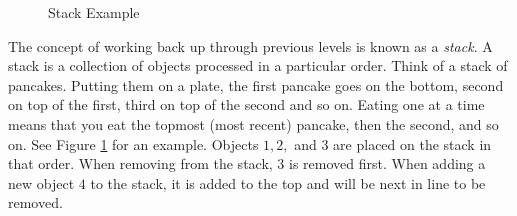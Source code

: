\documentclass[12pt,twoside]{reedthesis}
\begin{document}
\begin{figure}[h]
	\centering
	\caption{Stack Example}
	\label{fig:stack}
\end{figure}

The concept of working back up through previous levels is known as a \textit{stack}. A stack is a collection of objects processed in a particular order. Think of a stack of pancakes. Putting them on a plate, the first pancake goes on the bottom, second on top of the first, third on top of the second and so on. Eating one at a time means that you eat the topmost (most recent) pancake, then the second, and so on. See Figure \ref{fig:stack} for an example. Objects $1,2,$ and $3$ are placed on the stack in that order. When removing from the stack, $3$ is removed first. When adding a new object $4$ to the stack, it is added to the top and will be next in line to be removed.
\end{document}
